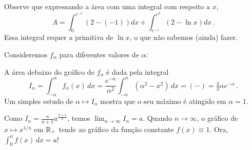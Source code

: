 \begin{Solution}{9.11}
\mbox{}
\begin{center}
\begin{bmlimage}\end{bmlimage}
\end{center}
Observe que expressando a área com uma integral com respeito a $x$,
$$A=\int_0^{e^{-1}}(2-(-1))dx+\int_{e^{-1}}^{e^2}(2-\ln x)
dx\,.$$
Essa integral requer a primitiva de $\ln x$, o que não
sabemos (ainda) fazer.
\end{Solution}
\begin{Solution}{9.12}
Consideremos $f_\alpha$ para diferentes valores de $\alpha$:
\begin{center}
\begin{bmlimage}\end{bmlimage}
\end{center}
A área debaixo do gráfico de $f_\alpha$ é dada pela integral
$$
I_\alpha=\int_{-\alpha}^\alpha f_\alpha(x)\,dx=\frac{e^{-\alpha}}{\alpha^2}
\int_{-\alpha}^\alpha(\alpha^2-x^2)\,dx=(\cdots)=\tfrac43 \alpha
e^{-\alpha}\,.$$
Um simples estudo de $\alpha\mapsto I_\alpha$ mostra que o seu máximo é
atingido em $\alpha=1$.
\end{Solution}
\begin{Solution}{9.13}
Como $I_n=\frac{n}{n+1}a^{\frac{n+1}{n}}$, temos $\lim_{n\to \infty}I_n=a$.
Quando $n\to \infty$, o gráfico de $x\mapsto x^{1/n}$ em $\mathbb{R}_+$ tende
ao gráfico da função constante $f(x)\equiv 1$. Ora, $\int_0^a f(x)\,dx=a$!
\end{Solution}
